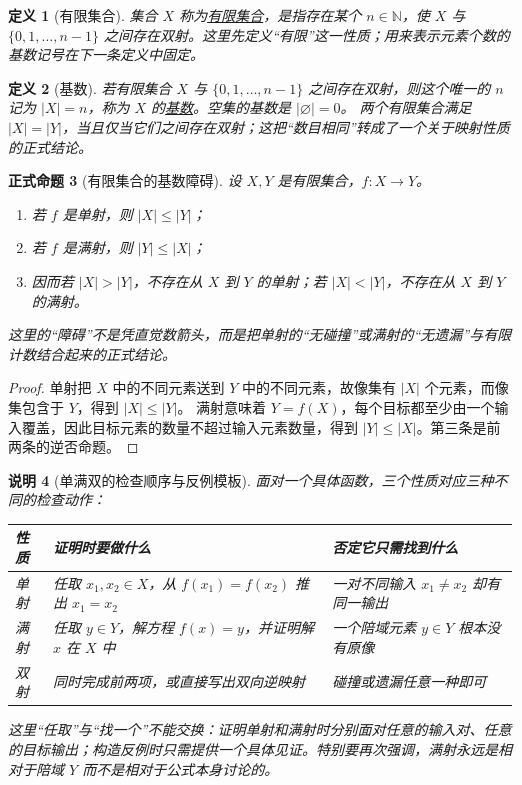 \documentclass[UTF8,fontset=none,a4paper,11pt]{ctexart}
\theoremstyle{foundation-definition}
\newtheorem{definition}{定义}[section]
\theoremstyle{foundation-theorem}
\theoremstyle{foundation-proposition}
\newtheorem{proposition}[definition]{正式命题}
\theoremstyle{foundation-example}
\theoremstyle{foundation-remark}
\newtheorem{remark}[definition]{说明}
\theoremstyle{foundation-theorem}
\newcommand{\term}[2]{\hyperref[#1]{#2}}
\begin{document}
\begin{definition}[有限集合]\label{def:finite-set}
集合 \(X\) 称为\term{def:finite-set}{有限集合}，是指存在某个 \(n\in\mathbb N\)，使 \(X\) 与
\(\{0,1,\ldots,n-1\}\) 之间存在双射。这里先定义“有限”这一性质；用来表示元素个数的基数记号在下一条定义中固定。
\end{definition}

\begin{definition}[基数]\label{def:cardinality}
若有限集合 \(X\) 与 \(\{0,1,\ldots,n-1\}\) 之间存在双射，则这个唯一的 \(n\) 记为
\(|X|=n\)，称为 \(X\) 的\term{def:cardinality}{基数}。空集的基数是 \(|\varnothing|=0\)。
两个有限集合满足 \(|X|=|Y|\)，当且仅当它们之间存在双射；这把“数目相同”转成了一个关于映射性质的正式结论。
\end{definition}

\begin{proposition}[有限集合的基数障碍]
设 \(X,Y\) 是有限集合，\(f:X\to Y\)。
\begin{enumerate}[label=(\alph*)]
  \item 若 \(f\) 是单射，则 \(|X|\le |Y|\)；
  \item 若 \(f\) 是满射，则 \(|Y|\le |X|\)；
  \item 因而若 \(|X|>|Y|\)，不存在从 \(X\) 到 \(Y\) 的单射；若 \(|X|<|Y|\)，不存在从 \(X\) 到 \(Y\) 的满射。
\end{enumerate}
这里的“障碍”不是凭直觉数箭头，而是把单射的“无碰撞”或满射的“无遗漏”与有限计数结合起来的正式结论。
\end{proposition}

\begin{proof}
单射把 \(X\) 中的不同元素送到 \(Y\) 中的不同元素，故像集有 \(|X|\) 个元素，而像集包含于 \(Y\)，得到 \(|X|\le |Y|\)。
满射意味着 \(Y=f(X)\)，每个目标都至少由一个输入覆盖，因此目标元素的数量不超过输入元素数量，得到 \(|Y|\le |X|\)。第三条是前两条的逆否命题。
\end{proof}

\begin{remark}[单满双的检查顺序与反例模板]
面对一个具体函数，三个性质对应三种不同的检查动作：
\begin{center}
\begin{tabularx}{\textwidth}{p{}p{}X}
\toprule
性质 & 证明时要做什么 & 否定它只需找到什么 \\
\midrule
单射 & 任取 \(x_1,x_2\in X\)，从 \(f(x_1)=f(x_2)\) 推出 \(x_1=x_2\) & 一对不同输入 \(x_1\ne x_2\) 却有同一输出 \\
满射 & 任取 \(y\in Y\)，解方程 \(f(x)=y\)，并证明解 \(x\) 在 \(X\) 中 & 一个陪域元素 \(y\in Y\) 根本没有原像 \\
双射 & 同时完成前两项，或直接写出双向逆映射 & 碰撞或遗漏任意一种即可 \\
\bottomrule
\end{tabularx}
\end{center}
这里“任取”与“找一个”不能交换：证明单射和满射时分别面对任意的输入对、任意的目标输出；构造反例时只需提供一个具体见证。特别要再次强调，满射永远是相对于陪域 \(Y\) 而不是相对于公式本身讨论的。
\end{remark}
\end{document}

